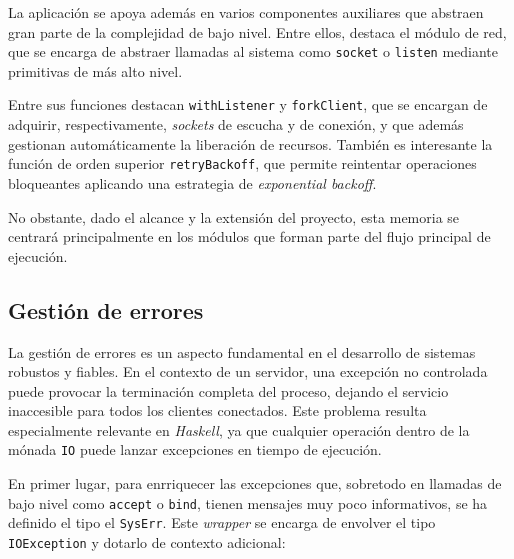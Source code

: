 \documentclass[a4paper]{CSMakotoTechnicalReport}
\begin{document}
\vspace{-10pt}
La aplicación se apoya además en varios componentes auxiliares que abstraen gran parte de la complejidad de bajo nivel. Entre ellos, destaca el módulo de red, que se encarga de abstraer llamadas al sistema como \texttt{socket} o \texttt{listen} mediante primitivas de más alto nivel.

Entre sus funciones destacan \texttt{withListener} y \texttt{forkClient}, que se encargan de adquirir, respectivamente, \textit{sockets} de escucha y de conexión, y que además gestionan automáticamente la liberación de recursos. También es interesante la función de orden superior \texttt{retryBackoff}, que permite reintentar operaciones bloqueantes aplicando una estrategia de \textit{exponential backoff}.

No obstante, dado el alcance y la extensión del proyecto, esta memoria se centrará principalmente en los módulos que forman parte del flujo principal de ejecución.


\subsection{Gestión de errores}

La gestión de errores es un aspecto fundamental en el desarrollo de sistemas robustos y fiables. En el contexto de un servidor, una excepción no controlada puede provocar la terminación completa del proceso, dejando el servicio inaccesible para todos los clientes conectados. Este problema resulta especialmente relevante en \textit{Haskell}, ya que cualquier operación dentro de la mónada \texttt{IO} puede lanzar excepciones en tiempo de ejecución.

En primer lugar, para enrriquecer las excepciones que, sobretodo en llamadas de bajo nivel como \texttt{accept} o \texttt{bind}, tienen mensajes muy poco informativos, se ha definido el tipo el \texttt{SysErr}. Este \textit{wrapper} se encarga de envolver el tipo \texttt{IOException} y dotarlo de contexto adicional:
\end{document}
